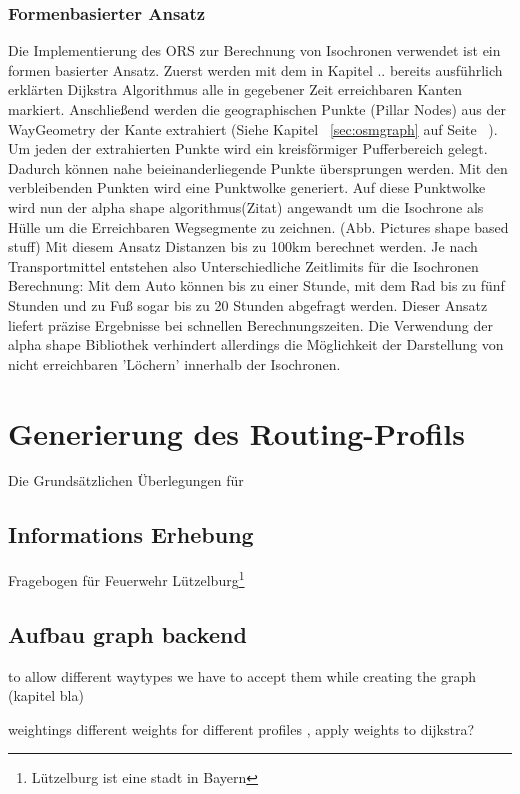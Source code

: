 \documentclass[12pt,a4paper]{article}
\begin{document}
\subsubsection{Formenbasierter Ansatz}
Die Implementierung des ORS zur Berechnung von Isochronen verwendet ist ein formen basierter Ansatz. Zuerst werden mit dem in Kapitel .. bereits ausführlich erklärten Dijkstra Algorithmus alle in gegebener Zeit erreichbaren Kanten markiert. Anschließend werden die geographischen Punkte (Pillar Nodes) aus der  WayGeometry der Kante extrahiert (Siehe Kapitel ~\ref{sec:osmgraph} auf Seite ~\pageref{sec:osmgraph}).  Um jeden der extrahierten Punkte wird ein kreisförmiger Pufferbereich gelegt. Dadurch können nahe beieinanderliegende Punkte übersprungen werden. Mit den verbleibenden Punkten wird eine Punktwolke generiert. Auf diese Punktwolke wird nun der alpha shape algorithmus(Zitat) angewandt um die Isochrone als Hülle um die Erreichbaren Wegsegmente zu zeichnen.
(Abb. Pictures shape based stuff)
Mit diesem Ansatz Distanzen bis zu 100km berechnet werden. Je nach Transportmittel entstehen also Unterschiedliche Zeitlimits für die Isochronen Berechnung: Mit dem Auto können bis zu einer Stunde, mit dem Rad bis zu fünf Stunden und zu Fuß sogar bis zu 20 Stunden abgefragt werden. Dieser Ansatz liefert präzise Ergebnisse bei schnellen Berechnungszeiten. Die Verwendung der alpha shape Bibliothek verhindert allerdings die Möglichkeit der Darstellung von nicht erreichbaren 'Löchern' innerhalb der Isochronen.

\newpage
\section{Generierung des Routing-Profils}
Die Grundsätzlichen Überlegungen für 
\subsection{Informations Erhebung}
Fragebogen für Feuerwehr Lützelburg\footnote{Lützelburg ist eine stadt in Bayern}

\subsection{Aufbau graph backend}
\label{backendGraphBuild}

to allow different waytypes we have to accept them while creating the graph (kapitel bla)

weightings 
 different weights for different profiles , apply weights to dijkstra?
 
\end{document}
